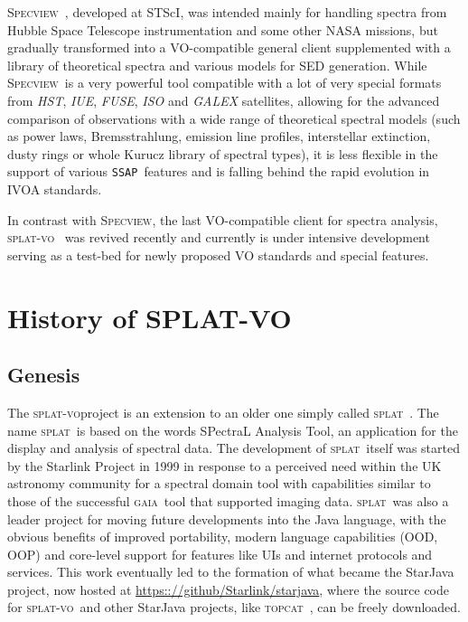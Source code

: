 \documentclass[final,authoryear,5p,times,twocolumn]{elsarticle}
\newcommand{\ssap}{\texttt{SSAP}}
\newcommand{\splat}{\textsc{splat}}
\newcommand{\splatvo}{\textsc{splat-vo}}
\newcommand{\topcat}{\textsc{topcat}}
\newcommand{\specview}{\textsc{Specview}}
\newcommand{\gaia}{\textsc{gaia}}
\newcommand{\ascl}[1]{\href{http://www.ascl.net/#1}{ascl:#1}}
\begin{document}
\specview\ \citep[][\ascl{1210.016}]{2002SPIE.4847..410B}, developed at
STScI, was intended mainly for handling spectra from Hubble Space
Telescope instrumentation and some other NASA missions, but gradually
transformed into a VO-compatible general client supplemented with a
library of theoretical spectra and various models for SED generation.
While \specview\ is a very powerful tool compatible with a lot of very
special formats from \emph{HST}, \emph{IUE}, \emph{FUSE}, \emph{ISO}
and \emph{GALEX} satellites, allowing for the advanced comparison of
observations with a wide range of theoretical spectral models (such as
power laws, Bremsstrahlung, emission line profiles, interstellar
extinction, dusty rings or whole Kurucz library of spectral types), it
is less flexible in the support of various \ssap\ features and is falling
behind the rapid evolution in IVOA standards.

In contrast with \specview, the last VO-compatible client for spectra analysis,
\splatvo\ \citep[][\ascl{1402.008}]{sun243} was revived recently and currently
is under intensive development serving as a test-bed for newly proposed VO
standards and special features.




\section{History of SPLAT-VO}
\subsection{Genesis}

The \splatvo project is an extension to an older one simply called
\splat\ \citep[][\ascl{1402.007}]{2002ASPC..281..513B}.  The name \splat\
is based on the words SPectraL Analysis Tool, an application for the
display and analysis of spectral data. The development of \splat\ itself
was started by the Starlink Project \citep{1982QJRAS..23..485D} in
1999 in response to a perceived need within the UK astronomy community
for a spectral domain tool with capabilities similar to those of the
successful \gaia\ tool \citep[][\ascl{1403.024}]{2000ASPC..216..615D}
that supported imaging data. \splat\ was also a leader project for
moving future developments into the Java language, with the obvious
benefits of improved portability, modern language capabilities (OOD,
OOP) and core-level support for features like UIs and internet
protocols and services. This work eventually led to the formation of
what became the StarJava project, now hosted at
\url{https:://github/Starlink/starjava}, where the source code for
\splatvo\ and other StarJava projects, like \topcat\
\citep[][\ascl{1101.010}]{2005ASPC..347...29T}, can be freely
downloaded.
\end{document}
